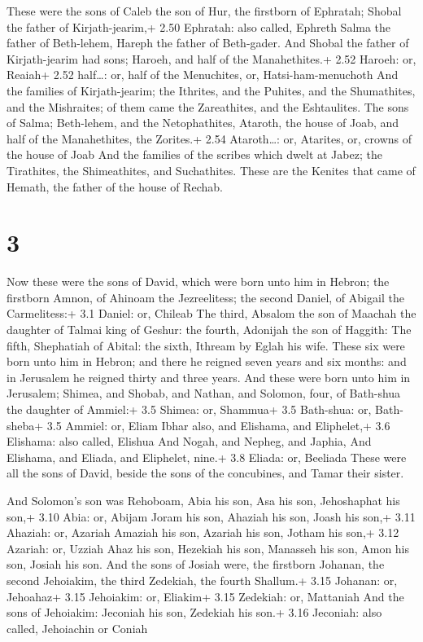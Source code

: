  These were the sons of Caleb the son of Hur, the
firstborn of Ephratah; Shobal the father of Kirjath-jearim,+ 2.50
Ephratah: also called, Ephreth  Salma the father of
Beth-lehem, Hareph the father of Beth-gader.  And Shobal
the father of Kirjath-jearim had sons; Haroeh, and half of the
Manahethites.+ 2.52 Haroeh: or, Reaiah+ 2.52 half\ldots: or, half of the
Menuchites, or, Hatsi-ham-menuchoth  And the families of
Kirjath-jearim; the Ithrites, and the Puhites, and the Shumathites, and
the Mishraites; of them came the Zareathites, and the Eshtaulites.
 The sons of Salma; Beth-lehem, and the Netophathites,
Ataroth, the house of Joab, and half of the Manahethites, the Zorites.+
2.54 Ataroth\ldots: or, Atarites, or, crowns of the house of Joab
 And the families of the scribes which dwelt at Jabez; the
Tirathites, the Shimeathites, and Suchathites. These are the Kenites
that came of Hemath, the father of the house of Rechab.

\hypertarget{section-2}{%
\section{3}\label{section-2}}

 Now these were the sons of David, which were born unto him
in Hebron; the firstborn Amnon, of Ahinoam the Jezreelitess; the second
Daniel, of Abigail the Carmelitess:+ 3.1 Daniel: or, Chileab
 The third, Absalom the son of Maachah the daughter of
Talmai king of Geshur: the fourth, Adonijah the son of Haggith:
 The fifth, Shephatiah of Abital: the sixth, Ithream by
Eglah his wife.  These six were born unto him in Hebron; and
there he reigned seven years and six months: and in Jerusalem he reigned
thirty and three years.  And these were born unto him in
Jerusalem; Shimea, and Shobab, and Nathan, and Solomon, four, of
Bath-shua the daughter of Ammiel:+ 3.5 Shimea: or, Shammua+ 3.5
Bath-shua: or, Bath-sheba+ 3.5 Ammiel: or, Eliam  Ibhar
also, and Elishama, and Eliphelet,+ 3.6 Elishama: also called, Elishua
 And Nogah, and Nepheg, and Japhia,  And
Elishama, and Eliada, and Eliphelet, nine.+ 3.8 Eliada: or, Beeliada
 These were all the sons of David, beside the sons of the
concubines, and Tamar their sister.

 And Solomon's son was Rehoboam, Abia his son, Asa his
son, Jehoshaphat his son,+ 3.10 Abia: or, Abijam  Joram his
son, Ahaziah his son, Joash his son,+ 3.11 Ahaziah: or, Azariah
 Amaziah his son, Azariah his son, Jotham his son,+ 3.12
Azariah: or, Uzziah  Ahaz his son, Hezekiah his son,
Manasseh his son,  Amon his son, Josiah his son.
 And the sons of Josiah were, the firstborn Johanan, the
second Jehoiakim, the third Zedekiah, the fourth Shallum.+ 3.15 Johanan:
or, Jehoahaz+ 3.15 Jehoiakim: or, Eliakim+ 3.15 Zedekiah: or, Mattaniah
 And the sons of Jehoiakim: Jeconiah his son, Zedekiah his
son.+ 3.16 Jeconiah: also called, Jehoiachin or Coniah

